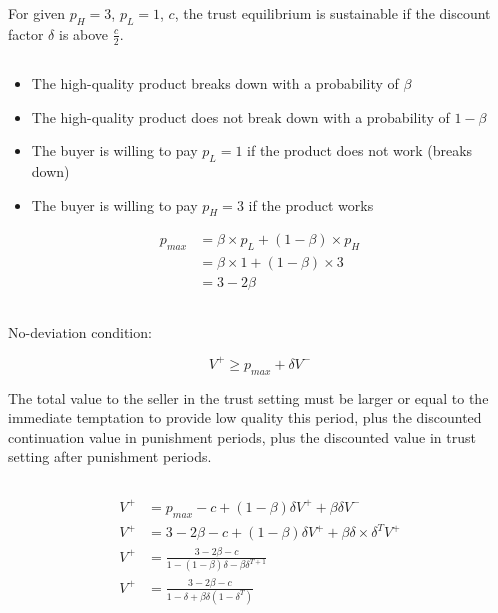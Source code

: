 \documentclass[a4paper, 11pt]{article}
\begin{document}
For given $p_H=3$, $p_L=1$, $c$, the trust equilibrium is sustainable if the discount factor $\delta$ is above $\frac{c}{2}$.

\subsection{} %

\begin{itemize}
    \item The high-quality product breaks down with a probability of $\beta$
    \item The high-quality product does not break down with a probability of $1-\beta$
    \item The buyer is willing to pay $p_L=1$ if the product does not work (breaks down)
    \item The buyer is willing to pay $p_H=3$ if the product works
\end{itemize}
\begin{align*}
    p_{max}&=\beta\times p_L + (1-\beta)\times p_H \\
    &=\beta\times1 + (1-\beta)\times3 \\
    &=3-2\beta
\end{align*}

\subsection{} %

No-deviation condition:

\[V^{+} \geq p_{max} + \delta V^{-}\]

The total value to the seller in the trust setting must be larger or equal to the immediate temptation to provide low quality this period, plus the discounted continuation value in punishment periods, plus the discounted value in trust setting after punishment periods.

\subsection{} %
\begin{align*}
    V^{+}&=p_{max}-c+(1-\beta)\delta V^{+}+\beta\delta V^{-} \\
    V^{+}&=3-2\beta-c+(1-\beta)\delta V^{+}+\beta\delta\times \delta^TV^{+} \\
    V^{+}&=\frac{3-2\beta-c}{1-(1-\beta)\delta-\beta\delta^{T+1}} \\
    V^{+}&=\frac{3-2\beta-c}{1-\delta+\beta\delta(1-\delta^T)}
\end{align*}
\end{document}
